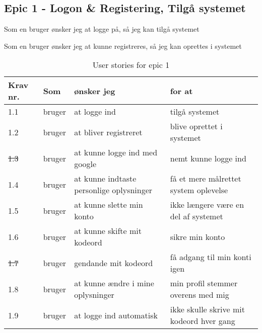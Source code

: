 \subsection{Epic 1 - Logon \& Registering, Tilgå systemet}

Som en bruger ønsker jeg at logge på, så jeg kan tilgå systemet

Som en bruger ønsker jeg at kunne registreres, så jeg kan oprettes i systemet

\begin{table}[H]
    \centering
    \caption{User stories for epic 1}
    \label{tab:us-epic1}
    \begin{tabular}{p{1cm}|p{2cm}|p{6cm}|p{6cm}}
        \textbf{Krav nr.} & \textbf{Som} & \textbf{ønsker jeg}                      & \textbf{for at}                          \\
        \hline
        1.1               & bruger       & at logge ind                             & tilgå systemet                           \\
        \hline
        1.2               & bruger       & at bliver registreret                    & blive oprettet i systemet                \\
        \hline
        \sout{1.3}               & bruger       & at kunne logge ind med google            & nemt kunne logge ind                     \\
        \hline
        1.4               & bruger       & at kunne indtaste personlige oplysninger & få et mere målrettet system oplevelse    \\
        \hline
        1.5               & bruger       & at kunne slette min konto                & ikke længere være en del af systemet     \\
        \hline
        1.6               & bruger       & at kunne skifte mit kodeord              & sikre min konto                          \\
        \hline
        \sout{1.7}               & bruger       & gendande mit kodeord                     & få adgang til min konti igen             \\
        \hline
        1.8               & bruger       & at kunne ændre i mine oplysninger        & min profil stemmer overens med mig       \\
        \hline
        1.9               & bruger       & at logge ind automatisk                  & ikke skulle skrive mit kodeord hver gang \\
    \end{tabular}
\end{table}

